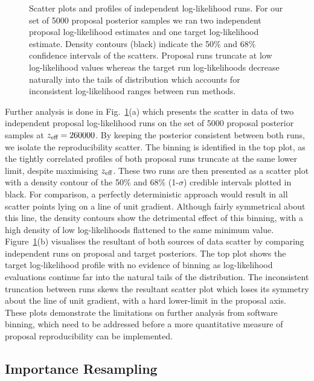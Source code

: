 \documentclass[a4paper]{jpconf}
\begin{document}
\begin{figure}
	\caption{Scatter plots and profiles of independent log-likelihood runs. For our set of 5000 proposal posterior samples we ran two independent proposal log-likelihood estimates and one target log-likelihood estimate. Density contours (black) indicate the 50\% and 68\% confidence intervals of the scatters. Proposal runs truncate at low log-likelihood values whereas the target run log-likelihoods decrease naturally into the tails of distribution which accounts for inconsistent log-likelihood ranges between run methods.}
	\label{fig:scatter}
\end{figure}

Further analysis is done in Fig.~\ref{fig:scatter}(a) which presents the scatter in data of two independent proposal log-likelihood runs on the set of 5000 proposal posterior samples at $z_\textup{eff} = 260000$. By keeping the posterior consistent between both runs, we isolate the reproducibility scatter. The binning is identified in the top plot, as the tightly correlated profiles of both proposal runs truncate at the same lower limit, despite maximising $z_\textup{eff}$. These two runs are then presented as a scatter plot with a density contour of the 50\% and 68\% (1-$\sigma$) credible intervals plotted in black. For comparison, a perfectly deterministic approach would result in all scatter points lying on a line of unit gradient. Although fairly symmetrical about this line, the density contours show the detrimental effect of this binning, with a high density of low log-likelihoods flattened to the same minimum value. Figure~\ref{fig:scatter}(b) visualises the resultant of both sources of data scatter by comparing independent runs on proposal and target posteriors. The top plot shows the target log-likelihood profile with no evidence of binning as log-likelihood evaluations continue far into the natural tails of the distribution. The inconsistent truncation between runs skews the resultant scatter plot which loses its symmetry about the line of unit gradient, with a hard lower-limit in the proposal axis. These plots demonstrate the limitations on further analysis from software binning, which need to be addressed before a more quantitative measure of proposal reproducibility can be implemented. 



\subsection{Importance Resampling}\label{results:resample} %
\end{document}
